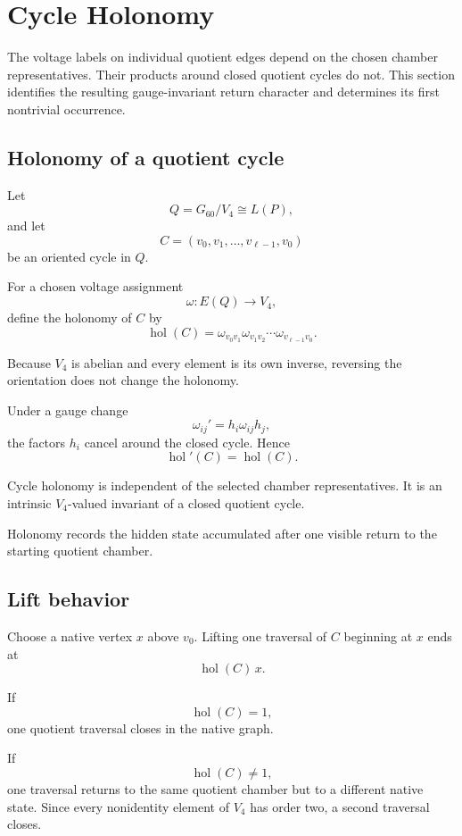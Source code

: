 \section{Cycle Holonomy}

The voltage labels on individual quotient edges depend on the chosen
chamber representatives. Their products around closed quotient cycles
do not. This section identifies the resulting gauge-invariant return
character and determines its first nontrivial occurrence.

\subsection{Holonomy of a quotient cycle}

Let
\[
Q=G_{60}/V_4\cong L(P),
\]
and let
\[
C=(v_0,v_1,\ldots,v_{\ell-1},v_0)
\]
be an oriented cycle in \(Q\).

For a chosen voltage assignment
\[
\omega:E(Q)\longrightarrow V_4,
\]
define the holonomy of \(C\) by
\[
\operatorname{hol}(C)
=
\omega_{v_0v_1}
\omega_{v_1v_2}
\cdots
\omega_{v_{\ell-1}v_0}.
\]

Because \(V_4\) is abelian and every element is its own inverse,
reversing the orientation does not change the holonomy.

Under a gauge change
\[
\omega_{ij}'=h_i\omega_{ij}h_j,
\]
the factors \(h_i\) cancel around the closed cycle. Hence
\[
\operatorname{hol}'(C)
=
\operatorname{hol}(C).
\]

\begin{proposition}
Cycle holonomy is independent of the selected chamber
representatives. It is an intrinsic \(V_4\)-valued invariant of a
closed quotient cycle.
\end{proposition}

Holonomy records the hidden state accumulated after one visible return
to the starting quotient chamber.

\subsection{Lift behavior}

Choose a native vertex \(x\) above \(v_0\). Lifting one traversal of
\(C\) beginning at \(x\) ends at
\[
\operatorname{hol}(C)\,x.
\]

If
\[
\operatorname{hol}(C)=1,
\]
one quotient traversal closes in the native graph.

If
\[
\operatorname{hol}(C)\neq1,
\]
one traversal returns to the same quotient chamber but to a different
native state. Since every nonidentity element of \(V_4\) has order
two, a second traversal closes.

